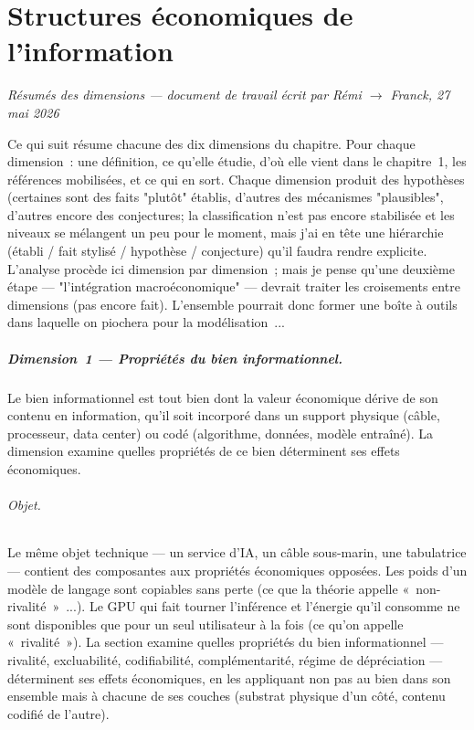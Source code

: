 \chapter{Structures économiques de l'information}\label{ch:economics}

\begin{center}
\textit{Résumés des dimensions --- document de travail écrit par Rémi $\to$ Franck, 27 mai 2026}
\end{center}

\bigskip

Ce qui suit résume chacune des dix dimensions du chapitre. Pour chaque dimension~: une définition, ce qu'elle étudie, d'où elle vient dans le chapitre~1, les références mobilisées, et ce qui en sort. Chaque dimension produit des hypothèses  (certaines sont des faits "plutôt" établis, d'autres des mécanismes "plausibles", d'autres encore des conjectures; la classification n'est pas encore stabilisée et les niveaux se mélangent un peu pour le moment, mais j'ai en tête une hiérarchie (établi / fait stylisé / hypothèse / conjecture) qu'il faudra rendre explicite. L'analyse procède ici dimension par dimension~; mais je pense qu'une deuxième étape --- "l'intégration macroéconomique" --- devrait traiter les croisements entre dimensions (pas encore fait). L'ensemble pourrait donc former une boîte à outils dans laquelle on piochera pour la modélisation~...

\paragraph{Dimension~1 --- Propriétés du bien informationnel.}
Le bien informationnel est tout bien dont la valeur économique dérive de son contenu en information, qu'il soit incorporé dans un support physique (câble, processeur, data center) ou codé (algorithme, données, modèle entraîné). La dimension examine quelles propriétés de ce bien déterminent ses effets économiques.

\subparagraph{Objet.}
Le même objet technique --- un service d'IA, un câble sous-marin, une tabulatrice --- contient des composantes aux propriétés économiques opposées. Les poids d'un modèle de langage sont copiables sans perte (ce que la théorie appelle «~non-rivalité~»~...). Le GPU qui fait tourner l'inférence et l'énergie qu'il consomme ne sont disponibles que pour un seul utilisateur à la fois (ce qu'on appelle «~rivalité~»). La section examine quelles propriétés du bien informationnel --- rivalité, excluabilité, codifiabilité, complémentarité, régime de dépréciation --- déterminent ses effets économiques, en les appliquant non pas au bien dans son ensemble mais à chacune de ses couches (substrat physique d'un côté, contenu codifié de l'autre).

